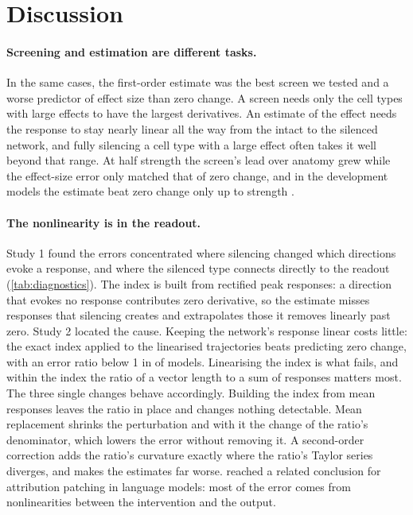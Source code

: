 \section{Discussion}
\label{sec:discussion}

\paragraph{Screening and estimation are different tasks.}
\enlargethispage{\baselineskip}In the same cases, the first-order estimate was the best screen we tested and a worse predictor of effect size than zero change. A screen needs only the cell types with large effects to have the largest derivatives. An estimate of the effect needs the response to stay nearly linear all the way from the intact to the silenced network, and fully silencing a cell type with a large effect often takes it well beyond that range. At half strength the screen's lead over anatomy grew while the effect-size error only matched that of zero change, and in the development models the estimate beat zero change only up to strength \DevBetterMaxStrength{}.

\paragraph{The nonlinearity is in the readout.}
Study 1 found the errors concentrated where silencing changed which directions evoke a response, and where the silenced type connects directly to the readout (\cref{tab:diagnostics}). The index is built from rectified peak responses: a direction that evokes no response contributes zero derivative, so the estimate misses responses that silencing creates and extrapolates those it removes linearly past zero. Study 2 located the cause. Keeping the network's response linear costs little: the exact index applied to the linearised trajectories beats predicting zero change, with an error ratio below 1 in \BelowOneCfRead{} of \NConfModels{} models. Linearising the index is what fails, and within the index the ratio of a vector length to a sum of responses matters most. The three single changes behave accordingly. Building the index from mean responses leaves the ratio in place and changes nothing detectable. Mean replacement shrinks the perturbation and with it the change of the ratio's denominator, which lowers the error without removing it. A second-order correction adds the ratio's curvature exactly where the ratio's Taylor series diverges, and makes the estimates far worse.  reached a related conclusion for attribution patching in language models: most of the error comes from nonlinearities between the intervention and the output.


